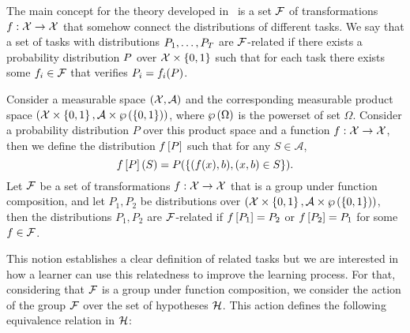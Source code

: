 The main concept for the theory developed in~\cite{Ben-DavidB08} is a set $\mathcal{F}$ of transformations $f: \mathcal{X} \to \mathcal{X}$ that somehow connect the distributions of different tasks. We say that a set of tasks with distributions $P_1, \ldots, P_T$ are $\mathcal{F}$-related if there exists a probability distribution $P$ over $\mathcal{X} \times \left\{0, 1\right\}$ such that for each task there exists some $f_i \in \mathcal{F}$ that verifies $P_i = f_i(P)$.

\begin{definition}\label{def:frel_tasks}
    Consider a measurable space $(\mathcal{X}, \mathcal{A})$ and the corresponding measurable product space $(\mathcal{X} \times \left\{0, 1\right\}, \mathcal{A} \times \wp\left( \left\{0, 1\right\} \right))$, where $\wp\left( \Omega \right)$ is the powerset of set $\Omega$. Consider a probability distribution $P$ over this product space and a function $f: \mathcal{X} \to \mathcal{X}$, then we define the distribution $f\left[ P \right]$ such that for any $S \in \mathcal{A}$,
    $$ f\left[ P \right](S) = P(\left\{(f(x), b), (x, b) \in S \right\}).$$
    Let $\mathcal{F}$ be a set of transformations $f: \mathcal{X} \to \mathcal{X}$ that is a group under function composition, and let $P_1, P_2$ be distributions over $(\mathcal{X} \times \left\{0, 1\right\}, \mathcal{A} \times \wp\left( \left\{0, 1\right\} \right))$, then the distributions $P_1, P_2$ are $\mathcal{F}$-related if $f\left[ P_1 \right]= P_2$ or $f\left[ P_2 \right] = P_1$ for some $f \in \mathcal{F}$.
\end{definition}
This notion establishes a clear definition of related tasks but we are interested in how a learner can use this relatedness to improve the learning process.
For that, considering that $\mathcal{F}$ is a group under function composition, we consider the action of the group $\mathcal{F}$ over the set of hypotheses $\mathcal{H}$. This action defines the following equivalence relation in $\mathcal{H}$:
